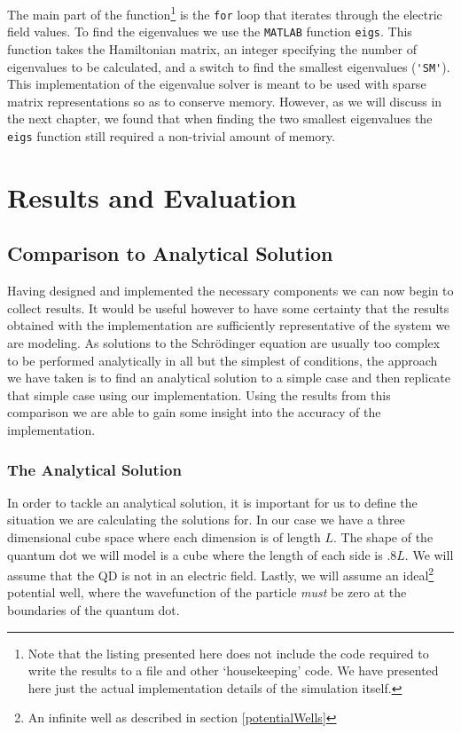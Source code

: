 \documentclass[authoryearcitations]{UoYCSproject}
\begin{document}
The main part of the function\footnote{Note that the listing presented here does not include the code required to write the
results to a file and other `housekeeping' code. We have presented here just the actual implementation details of the 
simulation itself.}  is the \verb+for+ loop that iterates through the electric field values. 
To find the eigenvalues we use the \verb+MATLAB+ function \verb+eigs+. This function takes the 
Hamiltonian matrix, an integer specifying the number of eigenvalues to be calculated, and a switch
to find the smallest eigenvalues (\verb+'SM'+). This implementation of the eigenvalue solver 
is meant to be used with sparse matrix representations so as to conserve memory. However, as we will
discuss in the next chapter, we found that when finding the two smallest eigenvalues the \verb+eigs+ function
still required a non-trivial amount of memory. 

\chapter{Results and Evaluation}


\section{Comparison to Analytical Solution}
Having designed and implemented the necessary components we can now begin to collect results. It would be 
useful however to have some certainty that the results obtained with the implementation are sufficiently
representative of the system we are modeling. As solutions to the Schr\"{o}dinger equation
are usually too complex to be performed analytically in all but the simplest of conditions, 
the approach we have taken is to find an analytical solution to a simple case and then replicate that
simple case using our implementation. Using the results from this comparison we are able to gain some
insight into the accuracy of the implementation. 

\subsection{The Analytical Solution}
In order to tackle an analytical solution, it is important for us to define the situation we are 
calculating the solutions for. In our case we have a three dimensional cube space where each dimension
is of length $L$. The shape of the quantum dot we will model is a cube where the length of each side
is $.8L$. We will assume that the QD is not in an electric field. Lastly, we will assume an ideal\footnote{An infinite well
as described in section \ref{potentialWells}} 
potential well, where the wavefunction of the particle
\emph{must} be zero at the boundaries of the quantum dot. 
\end{document}
